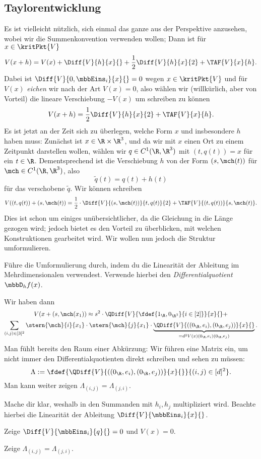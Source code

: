\documentclass[../WiSe22ANA3.tex]{subfiles}
\begin{document}
			\subsection*{Taylorentwicklung}
			Es ist vielleicht nützlich, sich einmal das ganze aus der \Taylor Perspektive anzusehen, wobei wir die \Einstein Summenkonvention verwenden wollen; Dann ist für $x\in\kritPkt{V}$ 
			$$V(x+h)=V(x)+\Diff{V}{h}{x}{}+\frac{1}{2}\Diff{V}{h}{x}{2}+\TAF{V}{x}{h}.$$
			Dabei ist $\Diff{V}{0,\mbbEins_i}{x}{}=0$ wegen $x\in\kritPkt{V}$ und für $V(x)$ \emph{eichen} wir nach der Art $V(x)=0$, also wählen wir (willkürlich, aber von Vorteil) die lineare Verschiebung $-V(x)$ um schreiben zu können 
			$$V(x+h)=\frac{1}{2}\Diff{V}{h}{x}{2}+\TAF{V}{x}{h}.$$
			Es ist jetzt an der Zeit sich zu überlegen, welche Form $x$ und insbesondere $h$ haben muss: Zunächst ist $x\in\R\times\R^3$, und da wir mit $x$ einen Ort zu einem Zeitpunkt darstellen wollen, wählen wir $q\in C^1(\R,\R^3)$ mit $(t,q(t))=x$ für ein $t\in\R$. Dementsprechend ist die Verschiebung $h$ von der Form $(s,\mch(t))$ für $\mch\in C^1(\R,\R^3)$, also
			$$\tilde q(t)=q(t)+h(t)$$
			für das verschobene $\tilde q$. Wir können schreiben
			$$V((t,q(t))+(s,\mch(t))=\frac{1}{2}\cdot\Diff{V}{(s,\mch(t))}{t,q(t)}{2}+\TAF{V}{(t,q(t))}{s,\mch(t)}.$$
			Dies ist schon um einiges unübersichtlicher, da die Gleichung in die Länge gezogen wird; jedoch bietet es den Vorteil zu überblicken, mit welchen Konstruktionen gearbeitet wird. Wir wollen nun jedoch die Struktur umformulieren. 
			\begin{Aufgabe}
				\nr Führe die Umformulierung durch, indem du die Linearität der Ableitung im Mehrdimensionalen verwendest. Verwende hierbei den \emph{Differentialquotient} $\mbbD_{h}f(x)$.  
			\end{Aufgabe}
			Wir haben dann
			\begin{multline*}
				V(x+(s,\mch(x_1))\approx s^2\cdot\QDiff{V}{\fdef{1_\R,0_{\R^3}}{i\in[2]}}{x}{}+\\
				\sum_{(i,j)\in[3]^2}\stern{\mch}{i}{x_1}\cdot\stern{\mch}{j}{x_1}\cdot\underbrace{\QDiff{V}{((0_\R,e_i),(0_\R,e_j))}{x}{}}_{=d^2V(x)(0_\R,e_i)(0_\R,e_j)}.
			\end{multline*}
			Man fühlt bereits den Raum einer Abkürzung: Wir führen eine Matrix ein, um nicht immer den Differentialquotienten direkt schreiben und sehen zu müssen: 
			$$\Lambda:=\fdef{\QDiff{V}{((0_\R,e_i),(0_\R,e_j))}{x}{}}{(i,j)\in[d]^2}.$$
			Man kann weiter zeigen $\Lambda_{(i,j)}=\Lambda_{(j,i)}$.
			\begin{Aufgabe}
				\nr Mache dir klar, weshalb in den \Taylor Summanden mit $h_i,h_j$ multipliziert wird. Beachte hierbei die Linearität der Ableitung $\Diff{V}{\mbbEins_i}{x}{}$.
				
				\nr Zeige $\Diff{V}{\mbbEins_i}{q}{}=0$ und $V(x)=0$.
				
				\nr Zeige $\Lambda_{(i,j)}=\Lambda_{(j,i)}$. 
			\end{Aufgabe}
\end{document}
